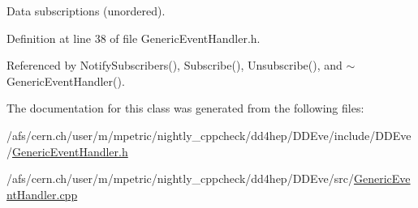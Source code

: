 Data subscriptions (unordered). 

Definition at line 38 of file GenericEventHandler.h.

Referenced by NotifySubscribers(), Subscribe(), Unsubscribe(), and $\sim$GenericEventHandler().

The documentation for this class was generated from the following files:\begin{DoxyCompactItemize}
\item 
/afs/cern.ch/user/m/mpetric/nightly\_\-cppcheck/dd4hep/DDEve/include/DDEve/\hyperlink{_generic_event_handler_8h}{GenericEventHandler.h}\item 
/afs/cern.ch/user/m/mpetric/nightly\_\-cppcheck/dd4hep/DDEve/src/\hyperlink{_generic_event_handler_8cpp}{GenericEventHandler.cpp}\end{DoxyCompactItemize}

